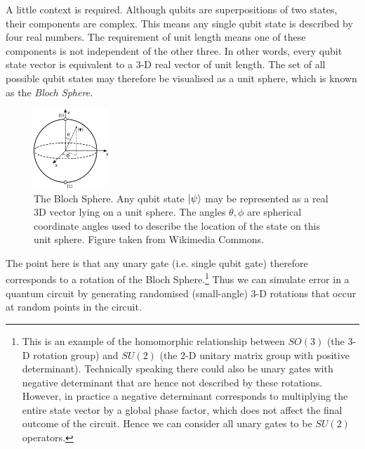 \documentclass{article}[11pt]
\begin{document}
A little context is required. Although qubits are superpositions of two states, their components are complex. This means any single qubit state is described by four real numbers. The requirement of unit length means one of these components is not independent of the other three. In other words, every qubit state vector is equivalent to a 3-D real vector of unit length. The set of all possible qubit states may therefore be visualised as a unit sphere, which is known as the \emph{Bloch Sphere.}\cite{nielsenChuang}
\begin{figure}[H]
    \centering
    \includegraphics[width=0.25\textwidth]{Pictures/bloch_sphere.png}
    \caption{The Bloch Sphere. Any qubit state $\ket{\psi}$ may be represented as a real 3D vector lying on a unit sphere. The angles $\theta,\phi$ are spherical coordinate angles used to describe the location of the state on this unit sphere. Figure taken from Wikimedia Commons.\cite{blochPicture}}
    \label{fig:bloch_sphere}
\end{figure}
The point here is that any unary gate (i.e. single qubit gate) therefore corresponds to a rotation of the Bloch Sphere.\footnote{This is an example of the homomorphic relationship between $SO(3)$ (the 3-D rotation group) and $SU(2)$ (the 2-D unitary matrix group with positive determinant).\cite{chenGroup} Technically speaking there could also be unary gates with negative determinant that are hence not described by these rotations. However, in practice a negative determinant corresponds to multiplying the entire state vector by a global phase factor, which does not affect the final outcome of the circuit. Hence we can consider all unary gates to be $SU(2)$ operators.} Thus we can simulate error in a quantum circuit by generating randomised (small-angle) 3-D rotations that occur at random points in the circuit.
\end{document}
